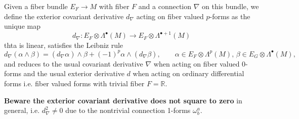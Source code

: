 \documentclass[../geometry_main.tex]{subfiles}
\begin{document}
\begin{mytheorem}
%
Given a fiber bundle $E_F \to M$ with fiber $F$ and a connection $\nabla$ on this bundle, we define the exterior covariant derivative $d_\nabla$ acting on fiber valued $p$-forms as the unique map
\begin{equation}
    d_\nabla: E_F \otimes \Lambda^\bullet (M)  \to E_F \otimes \Lambda^{\bullet +1} (M)
\end{equation}
thta is linear, satisfies the Leibniz rule 
\begin{equation}
    d_\nabla(\alpha \wedge \beta) = (d_\nabla \alpha) \wedge \beta + (-1)^p \alpha \wedge (d_\nabla \beta),\qquad \alpha \in E_F \otimes \Lambda^p (M),\, \beta \in E_G \otimes \Lambda^\bullet (M),
\end{equation}
and reduces to the usual covariant derivative $\nabla$ when acting on fiber valued $0$-forms and the usual exterior derivative $d$ when acting on ordinary differential forms i.e. fiber valued forms with trivial fiber $F = \mathbb{R}$.

\textbf{Beware  the exterior covariant derivative does not square to zero} in general, i.e. $d_\nabla^2 \neq 0$ due to the nontrivial connection 1-forms $\omega^a_b$.
\smallskip


\end{mytheorem}
\end{document}

